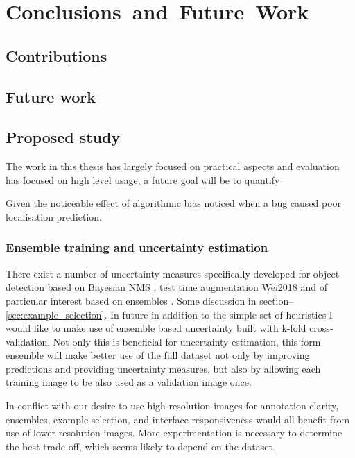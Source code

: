 \chapter{Conclusions~and~Future~Work}
\label{chap:future} 


\section{Contributions}





\section{Future work}

\section{Proposed study}
\label{sec:proposed_study}

The work in this thesis has largely focused on practical aspects and evaluation has focused on high level usage, a future goal will be to quantify 

Given the noticeable effect of algorithmic bias noticed when a bug caused poor localisation prediction.


\subsection{Ensemble training and uncertainty estimation}

There exist a number of uncertainty measures specifically developed for object detection based on Bayesian \gls{NMS} \cite{Harakeh}, test time augmentation {Wei2018} and of particular interest based on ensembles \cite{Le2018}. Some discussion in section--\ref{sec:example_selection}. In future in addition to the simple set of heuristics I would like to make use of ensemble based uncertainty built with k-fold cross-validation. Not only this is beneficial for uncertainty estimation, this form ensemble will make better use of the full dataset not only by improving predictions and providing uncertainty measures, but also by allowing each training image to be also used as a validation image once.

In conflict with our desire to use high resolution images for annotation clarity, ensembles, example selection, and interface responsiveness would all benefit from use of lower resolution images. More experimentation is necessary to determine the best trade off, which seems likely to depend on the dataset.



